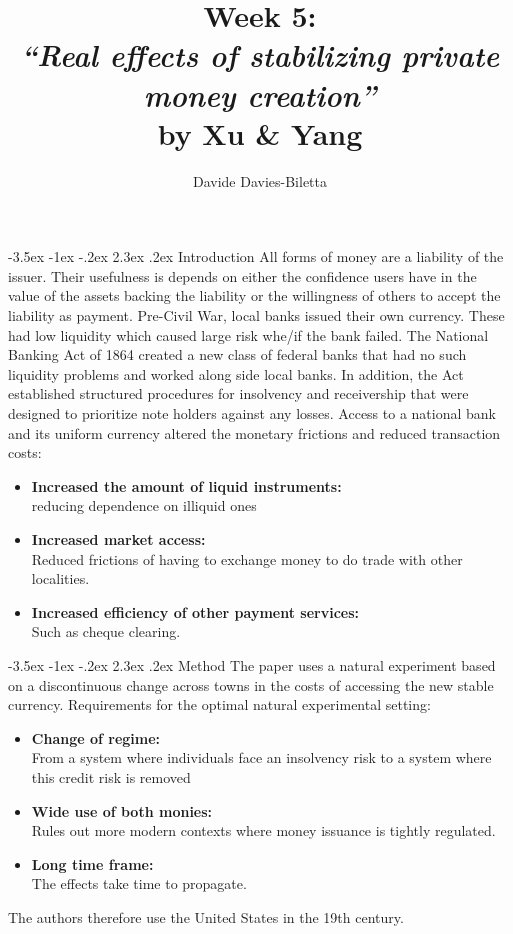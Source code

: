 \documentclass[]{article}
\title{Week 5:\\
	 \textit{``Real effects of stabilizing private money creation''}\\
	  by Xu \& Yang}
\author{Davide Davies-Biletta}
\makeatletter
\newcommand{\bb}{\bigbreak\noindent}
\renewcommand\section{\leftskip 0pt\@startsection {section}{1}{\z@}%
	{-3.5ex \@plus -1ex \@minus -.2ex}%
	{2.3ex \@plus.2ex}%
	{\normalfont\Large\bfseries}}
\makeatother
\begin{document}
\maketitle

\section{Introduction}
All forms of money are a liability of the issuer. Their usefulness is depends on either the confidence users have in
the value of the assets backing the liability or the willingness of others to accept the liability
as payment.
\bb
Pre-Civil War, local banks issued their own currency. These had low liquidity which caused large risk whe/if the bank failed.
\bb
The National Banking Act of 1864 created a new class of federal banks that had no such liquidity problems and worked along side local banks.  In addition, the Act established structured procedures for insolvency and receivership that were designed to prioritize note holders against any losses.
\bb
Access to a national bank and its uniform currency altered the monetary frictions  and reduced transaction costs:
\begin{itemize}[leftmargin=10ex]
	\item \textbf{Increased the amount of liquid instruments:}\\
	 reducing dependence on illiquid ones
	
	\item \textbf{Increased market access:}\\
	Reduced frictions of having to exchange money to do trade with other localities.
	
	\item \textbf{Increased efficiency of other payment services:}\\
	Such as cheque clearing.
\end{itemize}

\section{Method}
The paper uses a natural experiment based on a discontinuous change across towns in the costs of accessing the new stable currency. 
\bb
Requirements for the optimal natural experimental setting:
\begin{itemize}
	\item \textbf{Change of regime:}\\
	From a system where individuals face an insolvency risk to a system where this credit risk is removed
	
	\item \textbf{Wide use of both monies:}\\
	Rules out more modern contexts where money issuance is tightly regulated.
	
	\item \textbf{Long time frame:}\\
	The effects take time to propagate. 
\end{itemize}
The authors therefore use the United States in the 19th century.
\end{document}
